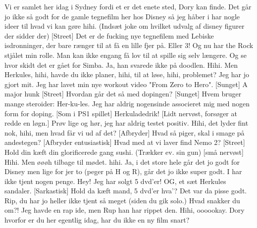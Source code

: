 \documentclass[a4paper,11pt]{article}
\begin{document}
\begin{sketch}
 Vi er samlet her idag i Sydney fordi et er det enete sted, Dory kan finde. Det går jo ikke så godt for de gamle tegnefilm her hos Disney så jeg håber i har nogle ideer til hvad vi kan gøre hihi. (Indsæt joke om hvilket udvalg af disney figurer der sidder der)
[Street] Det er de fucking nye tegnefilem med Lebiske isdronninger, der bare rænger til at få en lille fjer på. Eller 3!
 Og nu har the Rock stjålet min rolle. Man kan ikke engang få lov til at spille sig selv længere. Og se hvor skidt det er gået for Simba. 
 Ja, han svarede ikke på doodlen. Hihi. Men Herkules, hihi, havde du ikke planer, hihi, til at løse, hihi, problemet?
 Jeg har jo gjort mit. Jeg har lavet min nye workout video "From Zero to Hero".
[Sunget] A major hunk
[Street] Hvordan går det så med dopingen?
[Sunget] Hvem bruger mange steroider: Her-ku-les. 
 Jeg har aldrig nogensinde associeret mig med nogen form for doping. 
[Som i PS1 spillet] Herkuladedrik!
[Lidt nervøst, forsøger at redde en løgn.] Prøv lige og hør, jeg har aldrig testet positiv. 
 Hihi, det lyder fint nok, hihi, men hvad får vi ud af det? 
[Afbryder]  Hvad så piger, skal i smage på andestegen?
[Afbryder entusiastisk]  Hvad med at vi laver find Nemo 2?
[Street] Hold din kæft din glorificerede gang sushi. (Trækker ev. sin gun)
[små nervøst] Hihi. Men øøøh tilbage til mødet. hihi. Ja, i det store hele går det jo godt for Disney men lige for jer to (peger på H og R), går det jo ikke super godt. I har ikke tjent nogen penge. 
 Hey! Jeg har solgt 5 dvd'er! OG, et sæt Herkules sandaler.
[Sarkastisk]  Hold da kæft mand, 5 dvd'er hva'? Det var da pisse godt. 
 Rip, du har jo heller ikke tjent så meget (siden du gik solo.)
 Hvad snakker du om?! Jeg havde en rap ide, men Rup han har rippet den.
 Hihi, oooookay. Dory hvorfor er du her egentlig idag, har du ikke en ny film snart?

\end{sketch}
\end{document}
